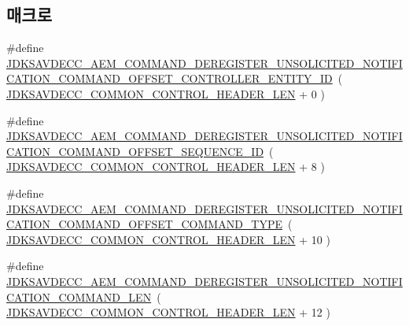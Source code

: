 \subsection*{매크로}
\begin{DoxyCompactItemize}
\item 
\#define \hyperlink{group__command__deregister__unsolicited__notification_gad103bdcb2ffba018c56ac6068e9839d1}{J\+D\+K\+S\+A\+V\+D\+E\+C\+C\+\_\+\+A\+E\+M\+\_\+\+C\+O\+M\+M\+A\+N\+D\+\_\+\+D\+E\+R\+E\+G\+I\+S\+T\+E\+R\+\_\+\+U\+N\+S\+O\+L\+I\+C\+I\+T\+E\+D\+\_\+\+N\+O\+T\+I\+F\+I\+C\+A\+T\+I\+O\+N\+\_\+\+C\+O\+M\+M\+A\+N\+D\+\_\+\+O\+F\+F\+S\+E\+T\+\_\+\+C\+O\+N\+T\+R\+O\+L\+L\+E\+R\+\_\+\+E\+N\+T\+I\+T\+Y\+\_\+\+ID}~( \hyperlink{group__jdksavdecc__avtp__common__control__header_gaae84052886fb1bb42f3bc5f85b741dff}{J\+D\+K\+S\+A\+V\+D\+E\+C\+C\+\_\+\+C\+O\+M\+M\+O\+N\+\_\+\+C\+O\+N\+T\+R\+O\+L\+\_\+\+H\+E\+A\+D\+E\+R\+\_\+\+L\+EN} + 0 )
\item 
\#define \hyperlink{group__command__deregister__unsolicited__notification_gac5988a6db005d9cd9704b5c73b67bbe0}{J\+D\+K\+S\+A\+V\+D\+E\+C\+C\+\_\+\+A\+E\+M\+\_\+\+C\+O\+M\+M\+A\+N\+D\+\_\+\+D\+E\+R\+E\+G\+I\+S\+T\+E\+R\+\_\+\+U\+N\+S\+O\+L\+I\+C\+I\+T\+E\+D\+\_\+\+N\+O\+T\+I\+F\+I\+C\+A\+T\+I\+O\+N\+\_\+\+C\+O\+M\+M\+A\+N\+D\+\_\+\+O\+F\+F\+S\+E\+T\+\_\+\+S\+E\+Q\+U\+E\+N\+C\+E\+\_\+\+ID}~( \hyperlink{group__jdksavdecc__avtp__common__control__header_gaae84052886fb1bb42f3bc5f85b741dff}{J\+D\+K\+S\+A\+V\+D\+E\+C\+C\+\_\+\+C\+O\+M\+M\+O\+N\+\_\+\+C\+O\+N\+T\+R\+O\+L\+\_\+\+H\+E\+A\+D\+E\+R\+\_\+\+L\+EN} + 8 )
\item 
\#define \hyperlink{group__command__deregister__unsolicited__notification_ga408a5a123bd211fcac51086b0e92f1a6}{J\+D\+K\+S\+A\+V\+D\+E\+C\+C\+\_\+\+A\+E\+M\+\_\+\+C\+O\+M\+M\+A\+N\+D\+\_\+\+D\+E\+R\+E\+G\+I\+S\+T\+E\+R\+\_\+\+U\+N\+S\+O\+L\+I\+C\+I\+T\+E\+D\+\_\+\+N\+O\+T\+I\+F\+I\+C\+A\+T\+I\+O\+N\+\_\+\+C\+O\+M\+M\+A\+N\+D\+\_\+\+O\+F\+F\+S\+E\+T\+\_\+\+C\+O\+M\+M\+A\+N\+D\+\_\+\+T\+Y\+PE}~( \hyperlink{group__jdksavdecc__avtp__common__control__header_gaae84052886fb1bb42f3bc5f85b741dff}{J\+D\+K\+S\+A\+V\+D\+E\+C\+C\+\_\+\+C\+O\+M\+M\+O\+N\+\_\+\+C\+O\+N\+T\+R\+O\+L\+\_\+\+H\+E\+A\+D\+E\+R\+\_\+\+L\+EN} + 10 )
\item 
\#define \hyperlink{group__command__deregister__unsolicited__notification_ga09edf0f352ed57aaf985b0426a11f09a}{J\+D\+K\+S\+A\+V\+D\+E\+C\+C\+\_\+\+A\+E\+M\+\_\+\+C\+O\+M\+M\+A\+N\+D\+\_\+\+D\+E\+R\+E\+G\+I\+S\+T\+E\+R\+\_\+\+U\+N\+S\+O\+L\+I\+C\+I\+T\+E\+D\+\_\+\+N\+O\+T\+I\+F\+I\+C\+A\+T\+I\+O\+N\+\_\+\+C\+O\+M\+M\+A\+N\+D\+\_\+\+L\+EN}~( \hyperlink{group__jdksavdecc__avtp__common__control__header_gaae84052886fb1bb42f3bc5f85b741dff}{J\+D\+K\+S\+A\+V\+D\+E\+C\+C\+\_\+\+C\+O\+M\+M\+O\+N\+\_\+\+C\+O\+N\+T\+R\+O\+L\+\_\+\+H\+E\+A\+D\+E\+R\+\_\+\+L\+EN} + 12 )
\end{DoxyCompactItemize}
